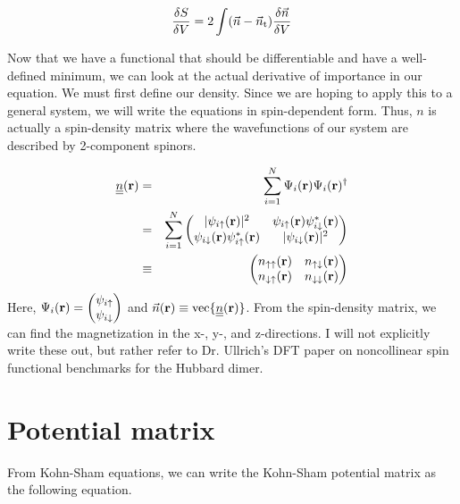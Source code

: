 \documentclass[10pt]{revtex4-1}
\newcommand{\bfr}{{\bf r}}
\newcommand{\ua}{\uparrow}
\newcommand{\da}{\downarrow}
\begin{document}
\begin{equation}
  \frac{\delta S}{\delta V} = 2 \int (\vec{n} - \vec{n}_{\text t}) \frac{\delta \vec{n}}{\delta V}
\end{equation}

Now that we have a functional that should be differentiable and have a well-defined minimum, we can look at the actual derivative of importance in our equation.
We must first define our density.
Since we are hoping to apply this to a general system, we will write the equations in spin-dependent form.
Thus, $n$ is actually a spin-density matrix where the wavefunctions of our system are described by 2-component spinors.

\begin{eqnarray}
  \nonumber \underline{\underline{n}}(\bfr) &=&  \sum_{i=1}^N \Psi_i(\bfr)\Psi_i(\bfr)^{\dagger} \\
  \nonumber
  &=& \sum_{i=1}^N
  \begin{pmatrix}
    |\psi_{i \ua}(\bfr)|^2 & \psi_{i \ua}(\bfr) \psi_{i \da}^* (\bfr) \\
    \psi_{i \da}(\bfr) \psi_{i \ua}^* (\bfr) & |\psi_{i \da}(\bfr)|^2 \\
  \end{pmatrix} \\
  &\equiv&
  \begin{pmatrix}
    n_{\ua \ua}(\bfr) & n_{\ua \da}(\bfr) \\
    n_{\da \ua}(\bfr) & n_{\da \da}(\bfr) \\
  \end{pmatrix}
\end{eqnarray}
Here, $\Psi_i(\bfr)=
\begin{pmatrix}
  \psi_{i \ua} \\
  \psi_{i \da}
\end{pmatrix}$
and $\vec{n}(\bfr) \equiv \text{vec}\{\underline{\underline{n}}(\bfr)\}$.
From the spin-density matrix, we can find the magnetization in the x-, y-, and z-directions.
I will not explicitly write these out, but rather refer to Dr. Ullrich's DFT paper on noncollinear spin functional benchmarks for the Hubbard dimer.

\section{Potential matrix}

From Kohn-Sham equations, we can write the Kohn-Sham potential matrix as the following equation.
\end{document}
